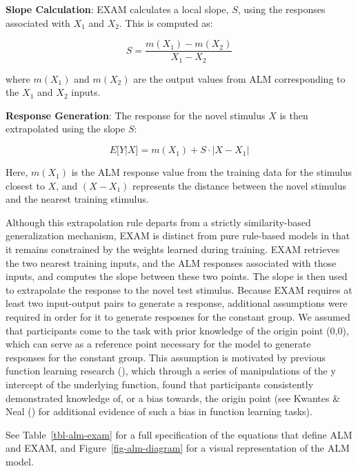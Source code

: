 \documentclass[
  11pt,
  letterpaper,
]{article}
\begin{document}
\textbf{Slope Calculation}: EXAM calculates a local slope, \(S\), using
the responses associated with \(X_1\) and \(X_2\). This is computed as:

\[
   S = \frac{m(X_{1}) - m(X_{2})}{X_{1} - X_{2}}
   \]

where \(m(X_1)\) and \(m(X_2)\) are the output values from ALM
corresponding to the \(X_1\) and \(X_2\) inputs.

\textbf{Response Generation}: The response for the novel stimulus \(X\)
is then extrapolated using the slope \(S\):

\[
   E[Y|X] = m(X_1) + S \cdot |X - X_1|
   \]

Here, \(m(X_1)\) is the ALM response value from the training data for
the stimulus closest to \(X\), and \((X - X_1)\) represents the distance
between the novel stimulus and the nearest training stimulus.

Although this extrapolation rule departs from a strictly
similarity-based generalization mechanism, EXAM is distinct from pure
rule-based models in that it remains constrained by the weights learned
during training. EXAM retrieves the two nearest training inputs, and the
ALM responses associated with those inputs, and computes the slope
between these two points. The slope is then used to extrapolate the
response to the novel test stimulus. Because EXAM requires at least two
input-output pairs to generate a response, additional assumptions were
required in order for it to generate resposnes for the constant group.
We assumed that participants come to the task with prior knowledge of
the origin point (0,0), which can serve as a reference point necessary
for the model to generate responses for the constant group. This
assumption is motivated by previous function learning research
(), which through a series of manipulations of the y intercept of
the underlying function, found that participants consistently
demonstrated knowledge of, or a bias towards, the origin point (see
Kwantes \& Neal ()
for additional evidence of such a bias in function learning tasks).

See Table~\ref{tbl-alm-exam} for a full specification of the equations
that define ALM and EXAM, and Figure~\ref{fig-alm-diagram} for a visual
representation of the ALM model.
\end{document}
